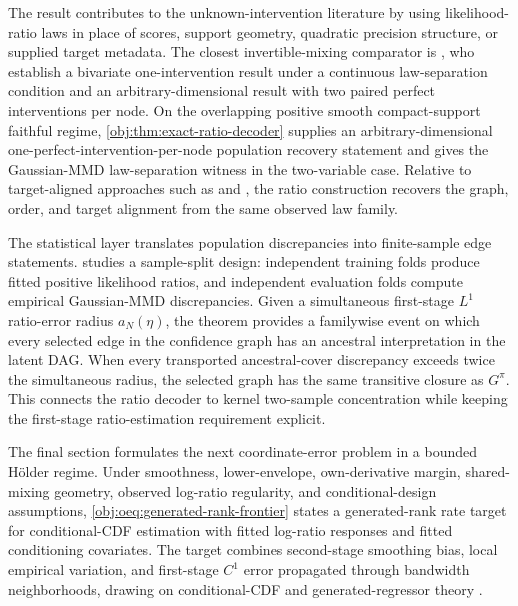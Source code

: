 The result contributes to the unknown-intervention literature by using likelihood-ratio laws in place of scores, support geometry, quadratic precision structure, or supplied target metadata. The closest invertible-mixing comparator is \citet{vonKugelgenEtAl2023UnknownInterventions}, who establish a bivariate one-intervention result under a continuous law-separation condition and an arbitrary-dimensional result with two paired perfect interventions per node. On the overlapping positive smooth compact-support faithful regime, \cref{obj:thm:exact-ratio-decoder} supplies an arbitrary-dimensional one-perfect-intervention-per-node population recovery statement and gives the Gaussian-MMD law-separation witness in the two-variable case. Relative to target-aligned approaches such as \citet{WendongEtAl2023CauCA} and \citet{YaoEtAl2025InvariancePrinciple}, the ratio construction recovers the graph, order, and target alignment from the same observed law family.

The statistical layer translates population discrepancies into finite-sample edge statements.  studies a sample-split design: independent training folds produce fitted positive likelihood ratios, and independent evaluation folds compute empirical Gaussian-MMD discrepancies. Given a simultaneous first-stage \(L^1\) ratio-error radius \(a_N(\eta)\), the theorem provides a familywise event on which every selected edge in the confidence graph has an ancestral interpretation in the latent DAG. When every transported ancestral-cover discrepancy exceeds twice the simultaneous radius, the selected graph has the same transitive closure as \(G^\pi\). This connects the ratio decoder to kernel two-sample concentration \citep{GrettonEtAl2012KernelTwoSample,SchrabEtAl2023MMDAgg} while keeping the first-stage ratio-estimation requirement explicit.

The final section formulates the next coordinate-error problem in a bounded Hölder regime. Under smoothness, lower-envelope, own-derivative margin, shared-mixing geometry, observed log-ratio regularity, and conditional-design assumptions, \cref{obj:oeq:generated-rank-frontier} states a generated-rank rate target for conditional-CDF estimation with fitted log-ratio responses and fitted conditioning covariates. The target combines second-stage smoothing bias, local empirical variation, and first-stage \(C^1\) error propagated through bandwidth neighborhoods, drawing on conditional-CDF and generated-regressor theory \citep{Xie2023UniformConditionalCDF,MammenRotheSchienle2012GeneratedCovariates,Lee2018PartialMeanGeneratedRegressors}.

